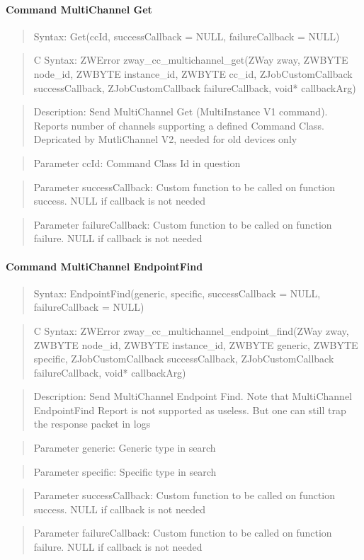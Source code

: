 \paragraph{Command MultiChannel Get}
\begin{quote}Syntax: Get(ccId, successCallback = NULL, failureCallback = NULL)\end{quote}
\begin{quote}C Syntax: ZWError zway\_cc\_multichannel\_get(ZWay zway, ZWBYTE node\_id, ZWBYTE instance\_id, ZWBYTE cc\_id, ZJobCustomCallback successCallback, ZJobCustomCallback failureCallback, void* callbackArg)\end{quote}
\begin{quote}Description: Send MultiChannel Get (MultiInstance V1 command). Reports number of channels supporting a defined Command Class. Depricated by MutliChannel V2, needed for old devices only\end{quote}
\begin{quote}Parameter ccId: Command Class Id in question\end{quote}
\begin{quote}Parameter successCallback: Custom function to be called on function success. NULL if callback is not needed\end{quote}
\begin{quote}Parameter failureCallback: Custom function to be called on function failure. NULL if callback is not needed\end{quote}


\paragraph{Command MultiChannel EndpointFind}
\begin{quote}Syntax: EndpointFind(generic, specific, successCallback = NULL, failureCallback = NULL)\end{quote}
\begin{quote}C Syntax: ZWError zway\_cc\_multichannel\_endpoint\_find(ZWay zway, ZWBYTE node\_id, ZWBYTE instance\_id, ZWBYTE generic, ZWBYTE specific, ZJobCustomCallback successCallback, ZJobCustomCallback failureCallback, void* callbackArg)\end{quote}
\begin{quote}Description: Send MultiChannel Endpoint Find. Note that MultiChannel EndpointFind Report is not supported as useless. But one can still trap the response packet in logs\end{quote}
\begin{quote}Parameter generic: Generic type in search\end{quote}
\begin{quote}Parameter specific: Specific type in search\end{quote}
\begin{quote}Parameter successCallback: Custom function to be called on function success. NULL if callback is not needed\end{quote}
\begin{quote}Parameter failureCallback: Custom function to be called on function failure. NULL if callback is not needed\end{quote}


